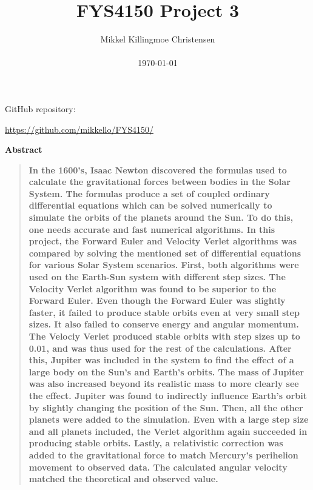 \documentclass[10pt,a4paper,titlepage]{article}
\title{FYS4150 Project 3}
\author
{Mikkel Killingmoe Christensen\\
\\
\normalsize{\today}
}
\date{}
\newenvironment{sciabstract}{%
\begin{quote} \bf}
{\end{quote}}
\begin{document}
 




\maketitle 
\begin{center}
\par GitHub repository:
\par \url{https://github.com/mikkello/FYS4150/}
\end{center}



\begin{center}
{\large \textbf{Abstract}}
\end{center}
\begin{sciabstract}
In the 1600's, Isaac Newton discovered the formulas used to calculate the gravitational forces between bodies in the Solar System. The formulas produce a set of coupled ordinary differential equations which can be solved numerically to simulate the orbits of the planets around the Sun. To do this, one needs accurate and fast numerical algorithms. In this project, the Forward Euler and Velocity Verlet algorithms was compared by solving the mentioned set of differential equations for various Solar System scenarios. First, both algorithms were used on the Earth-Sun system with different step sizes. The Velocity Verlet algorithm was found to be superior to the Forward Euler. Even though the Forward Euler was slightly faster, it failed to produce stable orbits even at very small step sizes. It also failed to conserve energy and angular momentum. The Velociy Verlet produced stable orbits with step sizes up to 0.01, and was thus used for the rest of the calculations.  After this, Jupiter was included in the system to find the effect of a large body on the Sun's and Earth's orbits. The mass of Jupiter was also increased beyond its realistic mass to more clearly see the effect. Jupiter was found to indirectly influence Earth's orbit by slightly changing the position of the Sun. Then, all the other planets were added to the simulation. Even with a large step size and all planets included, the Verlet algorithm again succeeded in producing stable orbits. Lastly, a relativistic correction was added to the gravitational force to match Mercury's perihelion movement to observed data. The calculated angular velocity matched the theoretical and observed value. 
\end{sciabstract}
\end{document}
